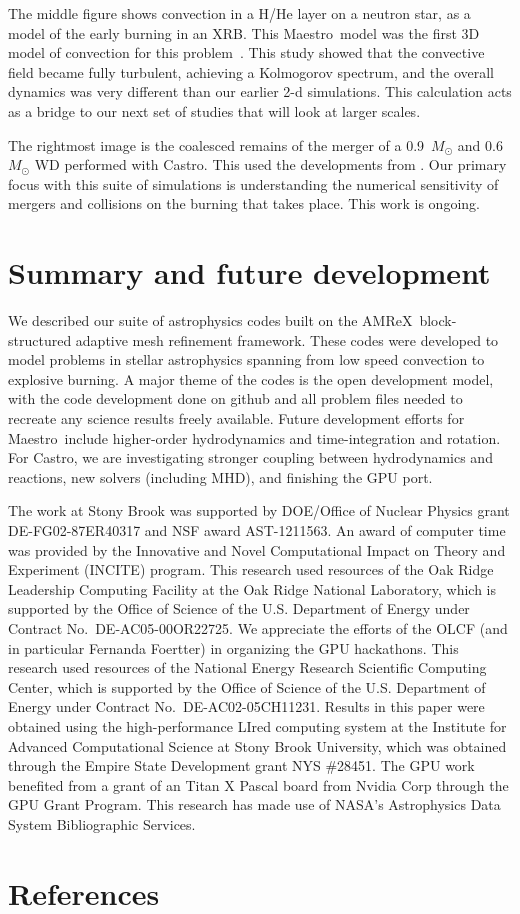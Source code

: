 \documentclass[a4paper]{jpconf}
\newcommand{\maestro}{{\sffamily Maestro}}
\newcommand{\castro}{{\sffamily Castro}}
\newcommand{\amrex}{{\sffamily AMReX}}
\begin{document}
The middle figure shows convection in a H/He layer on a neutron star,
as a model of the early burning in an XRB.  This \maestro\ model was
the first 3D model of convection for this problem~\cite{xrb3}.  This
study showed that the convective field became fully turbulent,
achieving a Kolmogorov spectrum, and the overall dynamics was very
different than our earlier 2-d simulations.  This calculation acts as 
a bridge to our next set of studies that will look at larger scales.

The rightmost image is the coalesced remains of the merger of a
0.9~$M_\odot$ and 0.6~$M_\odot$ WD performed with \castro.  This used
the developments from \cite{wdmergerI}.  Our primary focus with this
suite of simulations is understanding the numerical sensitivity of
mergers and collisions on the burning that takes place.  This work
is ongoing.


\section{Summary and future development}

We described our suite of astrophysics codes built on the
\amrex\ block-structured adaptive mesh refinement framework.  These
codes were developed to model problems in stellar astrophysics
spanning from low speed convection to explosive burning.  A major
theme of the codes is the open development model, with the code
development done on github and all problem files needed to recreate
any science results freely available.  Future development efforts for
\maestro\ include higher-order hydrodynamics and time-integration and
rotation.  For \castro, we are investigating stronger coupling between
hydrodynamics and reactions, new solvers (including MHD), and
finishing the GPU port.



\ack The work at Stony Brook was supported by DOE/Office of Nuclear
Physics grant DE-FG02-87ER40317 and NSF award AST-1211563.  An award
of computer time was provided by the Innovative and Novel
Computational Impact on Theory and Experiment (INCITE) program.  This
research used resources of the Oak Ridge Leadership Computing Facility
at the Oak Ridge National Laboratory, which is supported by the Office
of Science of the U.S. Department of Energy under Contract
No.\ DE-AC05-00OR22725.  We appreciate the efforts of the OLCF (and in
particular Fernanda Foertter) in organizing the GPU hackathons.  This
research used resources of the National Energy Research Scientific
Computing Center, which is supported by the Office of Science of the
U.S. Department of Energy under Contract No.\ DE-AC02-05CH11231.
Results in this paper were obtained using the high-performance LIred
computing system at the Institute for Advanced Computational Science
at Stony Brook University, which was obtained through the Empire State
Development grant NYS \#28451.  The GPU work benefited from a grant of
an Titan X Pascal board from Nvidia Corp through the GPU Grant
Program.  This research has made use of NASA's Astrophysics Data
System Bibliographic Services.

\section*{References}



\end{document}
